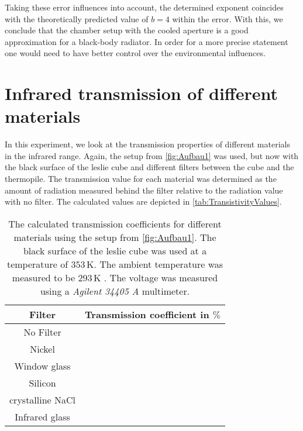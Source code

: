 \documentclass[a4paper,10pt,twocolumn]{article}
\begin{document}
    Taking these error influences into account, the determined exponent coincides with the theoretically predicted value of $b = 4 $ within the error.
    With this, we conclude that the chamber setup with the cooled aperture is a good approximation for a black-body radiator.
    In order for a more precise statement one would need to have better control over the environmental influences. 
    
    
    
    
    \section{Infrared transmission of different materials}\label{sec:Transmission}
    In this experiment, we look at the transmission properties of different materials in the infrared range.
    Again, the setup from \autoref{fig:Aufbau1} was used, but now with the black surface of the leslie cube and different filters between the cube and the thermopile.
    The transmission value for each material was determined as the amount of radiation measured behind the filter relative to the radiation value with no filter.
    The calculated values are depicted in \autoref{tab:TransistivityValues}.
    \begin{table}[htbp]          %
        \centering
        \begin{tabular*}{0.9\linewidth}{@{\extracolsep{\fill}}cc}
            \hline
            \hline
            \rule[-7pt]{0pt}{23pt}  Filter  &  Transmission coefficient in $\%$	 \\
            \hline
            \rule[-5pt]{0pt}{23pt}   No Filter  &   \TransistivityValue 	 \\
            \rule[-5pt]{0pt}{23pt}   Nickel   & \TransistivityValueOne    	 \\
            \rule[-5pt]{0pt}{23pt}   Window glass  &   \TransistivityValueTwo	 \\
            \rule[-5pt]{0pt}{23pt}   Silicon  &   \TransistivityValueThree  	 \\
            \rule[-5pt]{0pt}{23pt}   crystalline NaCl &   \TransistivityValueFour 	 \\
            \rule[-5pt]{0pt}{23pt}   Infrared glass  &   \TransistivityValueFive	 \\
            \hline
            \hline
        \end{tabular*}
        \normalsize
        \caption[]{The calculated transmission coefficients for different materials using the setup from \autoref{fig:Aufbau1}.
        The black surface of the leslie cube was used at a temperature of $353\,$K. The ambient temperature was measured to be $293\,$K .
        The voltage was measured using a \textit{Agilent 34405 A} multimeter.}  %
        \label{tab:TransistivityValues}                             %
    \end{table}
\end{document}
